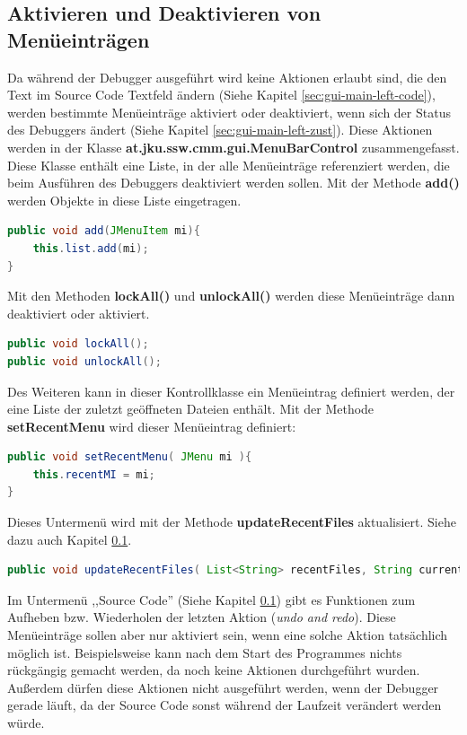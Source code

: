 \subsection{Aktivieren und Deaktivieren von Menüeinträgen}
Da während der Debugger ausgeführt wird keine Aktionen erlaubt sind, die den Text im Source Code Textfeld ändern (Siehe Kapitel \ref{sec:gui-main-left-code}), werden bestimmte Menüeinträge aktiviert oder deaktiviert, wenn sich der Status des Debuggers ändert (Siehe Kapitel \ref{sec:gui-main-left-zust}). Diese Aktionen werden in der Klasse \textbf{at.jku.ssw.cmm.gui.MenuBarControl} zusammengefasst. Diese Klasse enthält eine Liste, in der alle Menüeinträge referenziert werden, die beim Ausführen des Debuggers deaktiviert werden sollen. Mit der Methode \textbf{add()} werden Objekte in diese Liste eingetragen.
\begin{lstlisting}[language=JAVA]
public void add(JMenuItem mi){
	this.list.add(mi);
}
\end{lstlisting}

Mit den Methoden \textbf{lockAll()} und \textbf{unlockAll()} werden diese Menüeinträge dann deaktiviert oder aktiviert.

\begin{lstlisting}[language=JAVA]
public void lockAll();
public void unlockAll();
\end{lstlisting}

Des Weiteren kann in dieser Kontrollklasse ein Menüeintrag definiert werden, der eine Liste der zuletzt geöffneten Dateien enthält. Mit der Methode \textbf{setRecentMenu} wird dieser Menüeintrag definiert:
\begin{lstlisting}[language=JAVA]
public void setRecentMenu( JMenu mi ){
	this.recentMI = mi;
}
\end{lstlisting}

Dieses Untermenü wird mit der Methode \textbf{updateRecentFiles} aktualisiert. Siehe dazu auch Kapitel \ref{}.
\begin{lstlisting}[language=JAVA]
public void updateRecentFiles( List<String> recentFiles, String currentFile );
\end{lstlisting}

Im Untermenü ,,Source Code'' (Siehe Kapitel \ref{}) gibt es Funktionen zum Aufheben bzw. Wiederholen der letzten Aktion (\emph{undo and redo}). Diese Menüeinträge sollen aber nur aktiviert sein, wenn eine solche Aktion tatsächlich möglich ist. Beispielsweise kann nach dem Start des Programmes nichts rückgängig gemacht werden, da noch keine Aktionen durchgeführt wurden. Außerdem dürfen diese Aktionen nicht ausgeführt werden, wenn der Debugger gerade läuft, da der Source Code sonst während der Laufzeit verändert werden würde.

